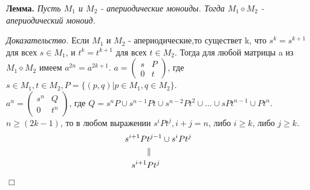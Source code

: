 \documentclass[a4paper,12pt]{article}
\begin{document}
\par\textbf{Лемма.} \textit{Пусть $M_1$ и $M_2$ - апериодические моноиды. Тогда $M_1 \diamond M_2$ - апериодический моноид.}\\
\par\textit{Доказательство.} Если $M_1$ и $M_2$ - апериодические,то существет k, что $s^k=s^{k+1}$ для всех $s \in M_1$, и $t^k=t^{k+1}$ для всех $t \in M_2$. Тогда для любой матрицы a из $M_1 \diamond M_2$ имеем $a^{2n}=a^{2k+1}$.
 $a=\left(\begin{array}{cc} s & P \\ 0 & t \end{array}\right)$, где $s \in M_1, t \in M_2, P=\{(p,q)| p \in M_1, q \in M_2\}$.
\\$a^n=\left(\begin{array}{cc} s^n & Q \\ 0 & t^n \end{array}\right)$, где $Q=s^nP \cup s^{n-1}Pt \cup s^{n-2}Pt^2 \cup \ldots \cup sPt^{n-1} \cup Pt^n$.
 $n \ge (2k-1)$, то в любом выражении $s^iPt^j, i+j=n$, либо $i \ge k$, либо $j \ge k$.
\\\notag\begin{equation}
\begin{split}s^{i+1}P&t^{j-1} \cup s^iPt^j\\ &\Arrowvert \\ s^{i+1}&Pt^j\end{split}\end{equation}
\begin{flushright}$\Box$\end{flushright}
\end{document}
